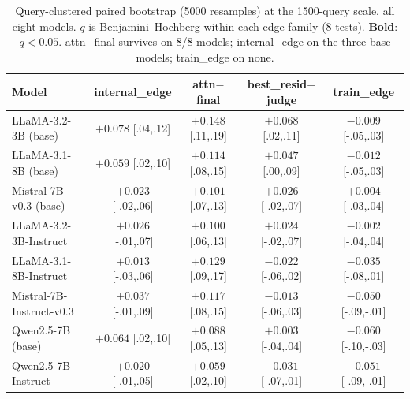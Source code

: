 \documentclass[11pt]{article}
\begin{document}
\begin{table}[t]
\centering\small
\setlength{\tabcolsep}{4pt}
\caption{Query-clustered paired bootstrap (5000 resamples) at the 1500-query
scale, all eight models. $q$ is Benjamini--Hochberg within each edge family
(8 tests). \textbf{Bold}: $q<0.05$. attn$-$final survives on 8/8 models;
internal\_edge on the three base models; train\_edge on none.}
\label{tab:sig}
\begin{tabular}{lcccc}
\toprule
Model & internal\_edge & attn$-$final & best\_resid$-$judge & train\_edge \\
\midrule
LLaMA-3.2-3B (base)      & \textbf{$+0.078$} [.04,.12] & \textbf{$+0.148$} [.11,.19] & \textbf{$+0.068$} [.02,.11] & $-0.009$ [-.05,.03] \\
LLaMA-3.1-8B (base)      & \textbf{$+0.059$} [.02,.10] & \textbf{$+0.114$} [.08,.15] & $+0.047$ [.00,.09]          & $-0.012$ [-.05,.03] \\
Mistral-7B-v0.3 (base)   & $+0.023$ [-.02,.06]         & \textbf{$+0.101$} [.07,.13] & $+0.026$ [-.02,.07]         & $+0.004$ [-.03,.04] \\
LLaMA-3.2-3B-Instruct    & $+0.026$ [-.01,.07]         & \textbf{$+0.100$} [.06,.13] & $+0.024$ [-.02,.07]         & $-0.002$ [-.04,.04] \\
LLaMA-3.1-8B-Instruct    & $+0.013$ [-.03,.06]         & \textbf{$+0.129$} [.09,.17] & $-0.022$ [-.06,.02]         & $-0.035$ [-.08,.01] \\
Mistral-7B-Instruct-v0.3 & $+0.037$ [-.01,.09]         & \textbf{$+0.117$} [.08,.15] & $-0.013$ [-.06,.03]         & $-0.050$ [-.09,-.01] \\
Qwen2.5-7B (base)        & \textbf{$+0.064$} [.02,.10] & \textbf{$+0.088$} [.05,.13] & $+0.003$ [-.04,.04]         & $-0.060$ [-.10,-.03] \\
Qwen2.5-7B-Instruct      & $+0.020$ [-.01,.05]         & \textbf{$+0.059$} [.02,.10] & $-0.031$ [-.07,.01]         & $-0.051$ [-.09,-.01] \\
\bottomrule
\end{tabular}
\end{table}
\end{document}
